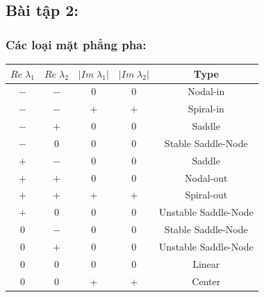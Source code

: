 \documentclass[a4paper]{article}
\begin{document}
\subsection{Bài tập 2:} \label{ex:2}
\subsubsection{Các loại mặt phẳng pha:}
\begin{center}
    \begin{tabular}{c c c c c}
        \hline
        $Re\;\lambda_1$ & $Re\;\lambda_2$ & $|Im\;\lambda_1|$ & $|Im\;\lambda_2|$ & \textbf{Type} \\ \hline
        $-$ & $-$ & 0 & 0 & Nodal-in \\
        $-$ & $-$ & $+$ & $+$ & Spiral-in \\
        $-$ & $+$ & 0 & 0 & Saddle \\
        $-$ & 0 & 0 & 0 & Stable Saddle-Node \\
        $+$ & $-$ & 0 & 0 & Saddle \\
        $+$ & $+$ & 0 & 0 & Nodal-out \\
        $+$ & $+$ & $+$ & $+$ & Spiral-out \\
        $+$ & 0 & 0 & 0 & Unstable Saddle-Node \\
        0 & $-$ & 0 & 0 & Stable Saddle-Node \\
        0 & $+$ & 0 & 0 & Unstable Saddle-Node \\
        0 & 0 & 0 & 0 &  Linear\\
        0 & 0 & $+$ & $+$ & Center \\
        \hline
    \end{tabular}
\end{center}
\end{document}
